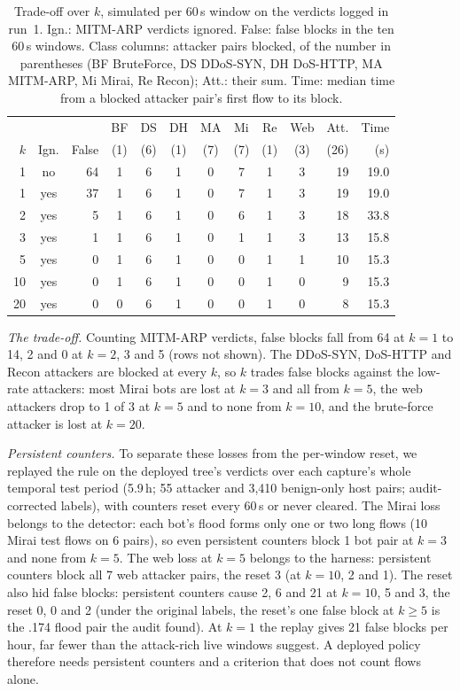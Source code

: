 \begin{table}[t]
\centering
\caption{Trade-off over $k$, simulated per 60\,s window on the verdicts logged in run~1. Ign.: MITM-ARP verdicts ignored. False: false blocks in the ten 60\,s windows. Class columns: attacker pairs blocked, of the number in parentheses (BF BruteForce, DS DDoS-SYN, DH DoS-HTTP, MA MITM-ARP, Mi Mirai, Re Recon); Att.: their sum. Time: median time from a blocked attacker pair's first flow to its block.}
\label{tab:kcurve}
\footnotesize
\setlength{\tabcolsep}{2.4pt}
\begin{tabular}{rcrcccccccrr}
\hline
 & & & BF & DS & DH & MA & Mi & Re & Web & Att. & Time \\
$k$ & Ign. & False & (1) & (6) & (1) & (7) & (7) & (1) & (3) & (26) & (s) \\
\hline
1  & no  & 64 & 1 & 6 & 1 & 0 & 7 & 1 & 3 & 19 & 19.0 \\
1  & yes & 37 & 1 & 6 & 1 & 0 & 7 & 1 & 3 & 19 & 19.0 \\
2  & yes &  5 & 1 & 6 & 1 & 0 & 6 & 1 & 3 & 18 & 33.8 \\
3  & yes &  1 & 1 & 6 & 1 & 0 & 1 & 1 & 3 & 13 & 15.8 \\
5  & yes &  0 & 1 & 6 & 1 & 0 & 0 & 1 & 1 & 10 & 15.3 \\
10 & yes &  0 & 1 & 6 & 1 & 0 & 0 & 1 & 0 &  9 & 15.3 \\
20 & yes &  0 & 0 & 6 & 1 & 0 & 0 & 1 & 0 &  8 & 15.3 \\
\hline
\end{tabular}
\end{table}

\emph{The trade-off.} Counting MITM-ARP verdicts, false blocks fall from 64 at $k=1$ to 14, 2 and 0 at $k=2$, 3 and 5 (rows not shown). The DDoS-SYN, DoS-HTTP and Recon attackers are blocked at every $k$, so $k$ trades false blocks against the low-rate attackers: most Mirai bots are lost at $k=3$ and all from $k=5$, the web attackers drop to 1 of 3 at $k=5$ and to none from $k=10$, and the brute-force attacker is lost at $k=20$.

\emph{Persistent counters.} To separate these losses from the per-window reset, we replayed the rule on the deployed tree's verdicts over each capture's whole temporal test period (5.9\,h; 55 attacker and 3,410 benign-only host pairs; audit-corrected labels), with counters reset every 60\,s or never cleared. The Mirai loss belongs to the detector: each bot's flood forms only one or two long flows (10 Mirai test flows on 6 pairs), so even persistent counters block 1 bot pair at $k=3$ and none from $k=5$. The web loss at $k=5$ belongs to the harness: persistent counters block all 7 web attacker pairs, the reset 3 (at $k=10$, 2 and 1). The reset also hid false blocks: persistent counters cause 2, 6 and 21 at $k=10$, 5 and 3, the reset 0, 0 and 2 (under the original labels, the reset's one false block at $k\ge5$ is the .174 flood pair the audit found). At $k=1$ the replay gives 21 false blocks per hour, far fewer than the attack-rich live windows suggest. A deployed policy therefore needs persistent counters and a criterion that does not count flows alone.

